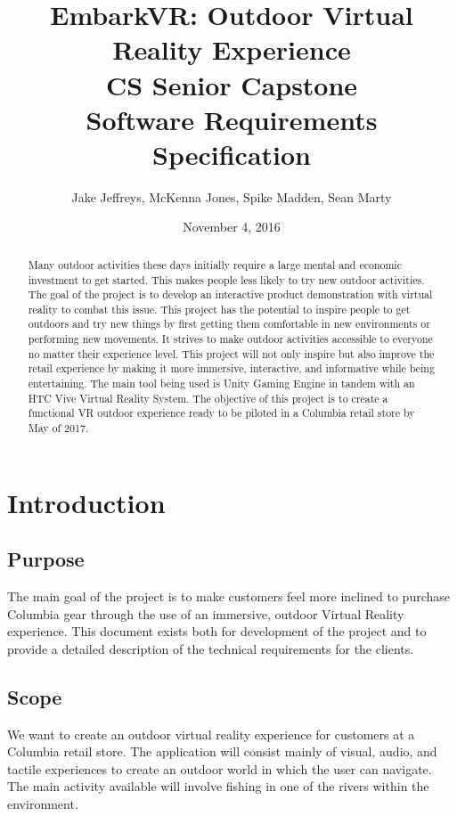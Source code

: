 \documentclass[10pt,journal,compsoc,onecolumn, draftclsnofoot]{IEEEtran}
\title{
EmbarkVR: Outdoor Virtual Reality Experience \\
CS Senior Capstone \\
Software Requirements Specification \\
\vspace{2cm}
}
\author{Jake Jeffreys, McKenna Jones, Spike Madden, Sean Marty}
\date{November 4, 2016}
\begin{document}
\begin{titlepage}
\vspace{3cm}
\maketitle
\vspace{3cm}
\begin{abstract}
Many outdoor activities these days initially require a large mental and economic
investment to get started. This makes people less likely to try new outdoor
activities. The goal of the project is to develop an interactive product
demonstration with virtual reality to combat this issue. This project has the
potential to inspire people to get outdoors and try new things by first getting
them comfortable in new environments or performing new movements. It strives to
make outdoor activities accessible to everyone no matter their experience level.
This project will not only inspire but also improve the retail experience by
making it more immersive, interactive, and informative while being
entertaining. The main tool being used is Unity Gaming Engine in tandem with an
HTC Vive Virtual Reality System. The objective of this project is to create a
functional VR outdoor experience ready to be piloted in a Columbia retail store
by May of 2017.
\end{abstract}

\end{titlepage}

\tableofcontents
\clearpage
\section{Introduction}

\subsection{Purpose}
The main goal of the project is to make customers feel more inclined to purchase
Columbia gear through the use of an immersive, outdoor Virtual Reality
experience. This document exists both for development of the project and to provide a detailed description of the technical requirements for the clients.

\subsection{Scope}
We want to create an outdoor virtual reality experience for customers at a
Columbia retail store. The application will consist mainly of visual, audio, and tactile
experiences to create an outdoor world in which the user can navigate. The main
activity available will involve fishing in one of the rivers within the
environment.
\end{document}
